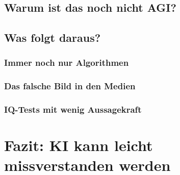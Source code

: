 	
	\subsection{Warum ist das noch nicht AGI?}\label{s2ss3}
	\subsection{Was folgt daraus?}\label{s2ss4}
		\subsubsection{Immer noch nur Algorithmen}\label{s2ss4sss1}
		\subsubsection{Das falsche Bild in den Medien}\label{s2ss4sss2}
		\subsubsection{IQ-Tests mit wenig Aussagekraft}\label{s2ss4sss3}
\section{Fazit: KI kann leicht missverstanden werden}\label{s3}